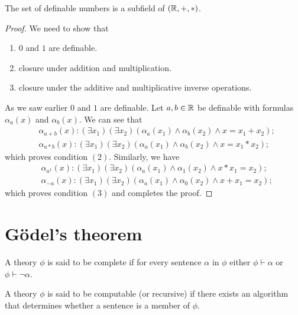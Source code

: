 \documentclass[11pt,a4paper]{article}
\begin{document}
\begin{proposition}
  The set of definable numbers is a subfield of $(\mathbb{R},+,*)$.
\end{proposition}
\begin{proof}
  We need to show that
  \begin{enumerate}
    \item[(1)] $0$ and $1$ are definable.
    \item[(2)] closure under addition and multiplication.
    \item[(3)] closure under the additive and multiplicative 
      inverse operations.
  \end{enumerate}
  As we saw earlier $0$ and $1$ are definable. Let $a,b \in \mathbb{R}$ be definable
  with formulas $\alpha_a(x)$ and $\alpha_b(x)$. We can see that
  \begin{align*}
    &\alpha_{a+b}(x) \colon (\exists x_1)(\exists x_2)
      (\alpha_a(x_1) \land \alpha_b(x_2) \land x = x_1 + x_2); \\
    &\alpha_{a*b}(x) \colon (\exists x_1)(\exists x_2)
      (\alpha_a(x_1) \land \alpha_b(x_2) \land x = x_1 * x_2);
  \end{align*}
  which proves condition $(2)$.
  Similarly, we have
  \begin{align*}
    &\alpha_{a^{1}}(x) \colon (\exists x_1)(\exists x_2)
      (\alpha_a(x_1) \land \alpha_1(x_2) \land x * x_1 = x_2); \\
    &\alpha_{-a}(x) \colon (\exists x_1)(\exists x_2)
      (\alpha_a(x_1) \land \alpha_0(x_2) \land x + x_1 = x_2);
  \end{align*}
  which proves condition $(3)$ and completes the proof.
\end{proof}

\section{Gödel's theorem}
\begin{definition}
  A theory $\phi$ is said to be complete if for every sentence $\alpha$
  in $\phi$ either $\phi \vdash \alpha$ or $\phi \vdash \neg \alpha$.
\end{definition}

\begin{definition}
  A theory $\phi$ is said to be computable (or recursive) if there 
  exists an algorithm that determines whether a sentence is 
  a member of $\phi$.
\end{definition}
\end{document}
